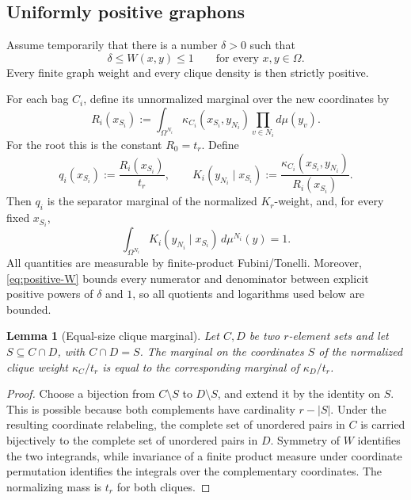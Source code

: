 \documentclass[11pt]{article}
\newtheorem{lemma}{Lemma}
\begin{document}
\subsection{Uniformly positive graphons}

Assume temporarily that there is a number \(\delta>0\) such that
\begin{equation}\label{eq:positive-W}
    \delta\le W(x,y)\le1
    \qquad\text{for every }x,y\in\Omega.
\end{equation}
Every finite graph weight and every clique density is then strictly positive.

For each bag \(C_i\), define its unnormalized marginal over the new
coordinates by
\[
    R_i(x_{S_i})
    :=
    \int_{\Omega^{N_i}}
       \kappa_{C_i}(x_{S_i},y_{N_i})
       \prod_{v\in N_i}d\mu(y_v).
\]
For the root this is the constant \(R_0=t_r\).  Define
\[
    q_i(x_{S_i}):=\frac{R_i(x_{S_i})}{t_r},
    \qquad
    K_i(y_{N_i}\mid x_{S_i})
    :=
    \frac{\kappa_{C_i}(x_{S_i},y_{N_i})}{R_i(x_{S_i})}.
\]
Then \(q_i\) is the separator marginal of the normalized \(K_r\)-weight,
and, for every fixed \(x_{S_i}\),
\begin{equation}\label{eq:conditional-one}
    \int_{\Omega^{N_i}}K_i(y_{N_i}\mid x_{S_i})\,d\mu^{N_i}(y)=1.
\end{equation}
All quantities are measurable by finite-product Fubini/Tonelli.  Moreover,
\eqref{eq:positive-W} bounds every numerator and denominator between explicit
positive powers of \(\delta\) and \(1\), so all quotients and logarithms used
below are bounded.

\begin{lemma}[Equal-size clique marginal]\label{lem:equal-marginal}
Let \(C,D\) be two \(r\)-element sets and let \(S\subseteq C\cap D\), with
\(C\cap D=S\).  The marginal on the coordinates \(S\) of the normalized
clique weight \(\kappa_C/t_r\) is equal to the corresponding marginal of
\(\kappa_D/t_r\).
\end{lemma}

\begin{proof}
Choose a bijection from \(C\setminus S\) to \(D\setminus S\), and extend it by
the identity on \(S\).  This is possible because both complements have
cardinality \(r-|S|\).  Under the resulting coordinate relabeling, the
complete set of unordered pairs in \(C\) is carried bijectively to the
complete set of unordered pairs in \(D\).  Symmetry of \(W\) identifies the
two integrands, while invariance of a finite product measure under coordinate
permutation identifies the integrals over the complementary coordinates.
The normalizing mass is \(t_r\) for both cliques.
\end{proof}
\end{document}
